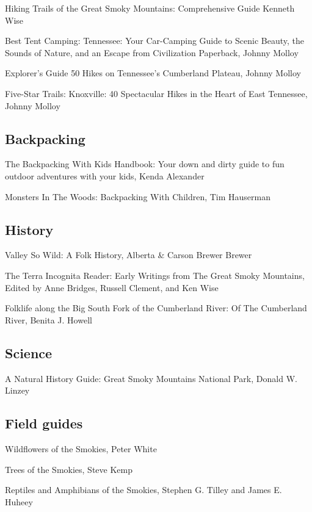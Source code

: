 \documentclass[
  letterpaper,
  DIV=11,
  numbers=noendperiod]{scrreprt}
\begin{document}
Hiking Trails of the Great Smoky Mountains: Comprehensive Guide Kenneth
Wise

Best Tent Camping: Tennessee: Your Car-Camping Guide to Scenic Beauty,
the Sounds of Nature, and an Escape from Civilization Paperback, Johnny
Molloy

Explorer's Guide 50 Hikes on Tennessee's Cumberland Plateau, Johnny
Molloy

Five-Star Trails: Knoxville: 40 Spectacular Hikes in the Heart of East
Tennessee, Johnny Molloy

\subsection{Backpacking}\label{backpacking}

The Backpacking With Kids Handbook: Your down and dirty guide to fun
outdoor adventures with your kids, Kenda Alexander

Monsters In The Woods: Backpacking With Children, Tim Hauserman

\subsection{History}\label{history}

Valley So Wild: A Folk History, Alberta \& Carson Brewer Brewer

The Terra Incognita Reader: Early Writings from The Great Smoky
Mountains, Edited by Anne Bridges, Russell Clement, and Ken Wise

Folklife along the Big South Fork of the Cumberland River: Of The
Cumberland River, Benita J. Howell

\subsection{Science}\label{science}

A Natural History Guide: Great Smoky Mountains National Park, Donald W.
Linzey

\subsection{Field guides}\label{field-guides}

Wildflowers of the Smokies, Peter White

Trees of the Smokies, Steve Kemp

Reptiles and Amphibians of the Smokies, Stephen G. Tilley and James E.
Huheey
\end{document}
